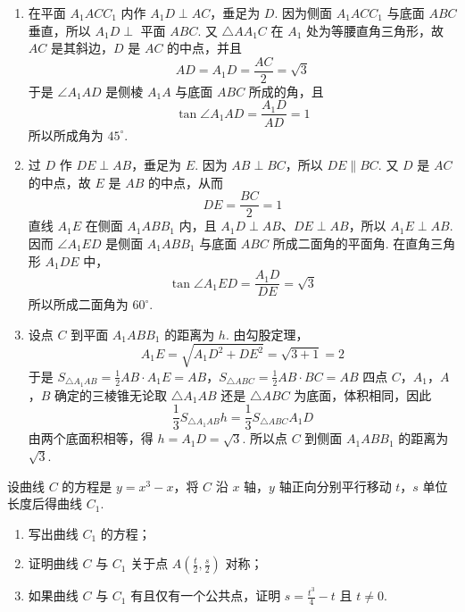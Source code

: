 \documentclass[UTF8,a4paper,oneside,11pt]{ctexbook}
\begin{document}
\begin{solution}
\begin{enumerate}
\item 在平面 \(A_{1}ACC_{1}\) 内作 \(A_{1}D\perp AC\)，垂足为 \(D\). 因为侧面 \(A_{1}ACC_{1}\) 与底面 \(ABC\) 垂直，所以 \(A_{1}D\perp\) 平面 \(ABC\). 又 \(\triangle AA_{1}C\) 在 \(A_{1}\) 处为等腰直角三角形，故 \(AC\) 是其斜边，\(D\) 是 \(AC\) 的中点，并且
\[
AD=A_{1}D=\frac{AC}{2}=\sqrt{3}
\]
于是 \(\angle A_{1}AD\) 是侧棱 \(A_{1}A\) 与底面 \(ABC\) 所成的角，且
\[
\tan\angle A_{1}AD=\frac{A_{1}D}{AD}=1
\]
所以所成角为 \(45^{\circ}\).

\item 过 \(D\) 作 \(DE\perp AB\)，垂足为 \(E\). 因为 \(AB\perp BC\)，所以 \(DE\parallel BC\). 又 \(D\) 是 \(AC\) 的中点，故 \(E\) 是 \(AB\) 的中点，从而
\[
DE=\frac{BC}{2}=1
\]
直线 \(A_{1}E\) 在侧面 \(A_{1}ABB_{1}\) 内，且 \(A_{1}D\perp AB\)、\(DE\perp AB\)，所以 \(A_{1}E\perp AB\). 因而 \(\angle A_{1}ED\) 是侧面 \(A_{1}ABB_{1}\) 与底面 \(ABC\) 所成二面角的平面角. 在直角三角形 \(A_{1}DE\) 中，
\[
\tan\angle A_{1}ED=\frac{A_{1}D}{DE}=\sqrt{3}
\]
所以所成二面角为 \(60^{\circ}\).

\item 设点 \(C\) 到平面 \(A_{1}ABB_{1}\) 的距离为 \(h\). 由勾股定理，
\[
A_{1}E=\sqrt{A_{1}D^{2}+DE^{2}}=\sqrt{3+1}=2
\]
于是
\(S_{\triangle A_{1}AB}=\frac12 AB\cdot A_{1}E=AB\)，\(S_{\triangle ABC}=\frac12 AB\cdot BC=AB\)
四点 \(C\)，\(A_{1}\)，\(A\)，\(B\) 确定的三棱锥无论取 \(\triangle A_{1}AB\) 还是 \(\triangle ABC\) 为底面，体积相同，因此
\[
\frac13S_{\triangle A_{1}AB}h=\frac13S_{\triangle ABC}A_{1}D
\]
由两个底面积相等，得 \(h=A_{1}D=\sqrt{3}\). 所以点 \(C\) 到侧面 \(A_{1}ABB_{1}\) 的距离为 \(\sqrt{3}\).
\end{enumerate}
\end{solution}

\begin{problem}
设曲线 \(C\) 的方程是 \(y = x^{3} - x\)，将 \(C\) 沿 \(x\) 轴，\(y\) 轴正向分别平行移动 \(t\)，\(s\) 单位长度后得曲线 \(C_{1}\).

\begin{enumerate}
\item 写出曲线 \(C_{1}\) 的方程；
\item 证明曲线 \(C\) 与 \(C_{1}\) 关于点 \(A\left(\frac{t}{2}, \frac{s}{2}\right)\) 对称；
\item 如果曲线 \(C\) 与 \(C_{1}\) 有且仅有一个公共点，证明 \(s = \frac{t^{3}}{4} - t\) 且 \(t \neq 0\).
\end{enumerate}
\end{problem}
\end{document}
